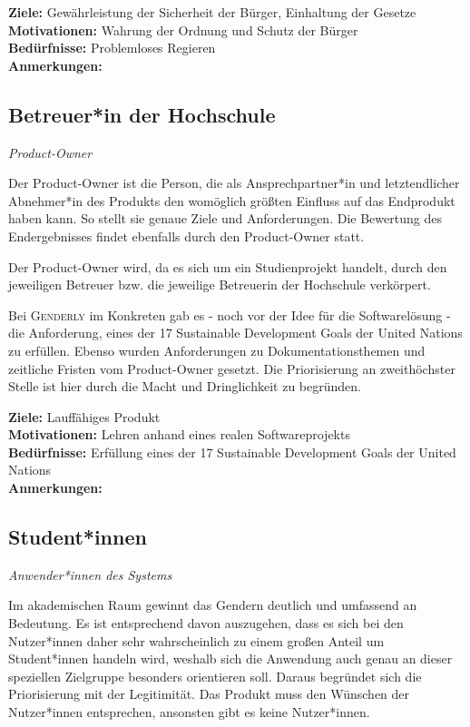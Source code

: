 \documentclass[paper=a4, parskip=half]{scrreprt}
\begin{document}
\textbf{Ziele:} Gewährleistung der Sicherheit der Bürger, Einhaltung der Gesetze\\
\textbf{Motivationen:} Wahrung der Ordnung und Schutz der Bürger\\
\textbf{Bedürfnisse:} Problemloses Regieren\\
\textbf{Anmerkungen:}\\

\subsection{Betreuer*in der Hochschule}
\vspace{-0.5cm}\textit{Product-Owner}

Der Product-Owner ist die Person, die als Ansprechpartner*in und letztendlicher Abnehmer*in des Produkts den womöglich größten Einfluss auf das Endprodukt haben kann. So stellt sie genaue Ziele und Anforderungen. Die Bewertung des Endergebnisses findet ebenfalls durch den Product-Owner statt.

Der Product-Owner wird, da es sich um ein Studienprojekt handelt, durch den jeweiligen Betreuer bzw. die jeweilige Betreuerin der Hochschule verkörpert.

Bei \textsc{Genderly} im Konkreten gab es - noch vor der Idee für die Softwarelösung - die Anforderung, eines der 17 Sustainable Development Goals der United Nations \cite{UNGoals} zu erfüllen. Ebenso wurden Anforderungen zu Dokumentationsthemen und zeitliche Fristen vom Product-Owner gesetzt. Die Priorisierung an zweithöchster Stelle ist hier durch die Macht und Dringlichkeit zu begründen.

\vspace{0.5cm}

\textbf{Ziele:} Lauffähiges Produkt\\
\textbf{Motivationen:} Lehren anhand eines realen Softwareprojekts\\
\textbf{Bedürfnisse:} Erfüllung eines der 17 Sustainable Development Goals der United Nations\\
\textbf{Anmerkungen:}\\

\subsection{Student*innen}
\vspace{-0.5cm}\textit{Anwender*innen des Systems}

Im akademischen Raum gewinnt das Gendern deutlich und umfassend an Bedeutung. Es ist entsprechend davon auszugehen, dass es sich bei den Nutzer*innen daher sehr wahrscheinlich zu einem großen Anteil um Student*innen handeln wird, weshalb sich die Anwendung auch genau an dieser speziellen Zielgruppe besonders orientieren soll. Daraus begründet sich die Priorisierung mit der Legitimität. Das Produkt muss den Wünschen der Nutzer*innen entsprechen, ansonsten gibt es keine Nutzer*innen.\\
\end{document}
